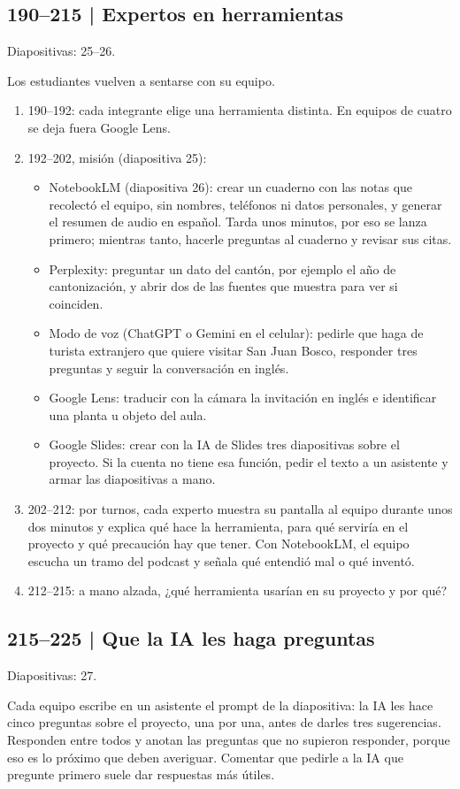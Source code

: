 \documentclass[11pt,a4paper]{article}
\newcommand{\diapos}[1]{\textcolor{gris}{\small\textsf{Diapositivas: #1}}\par}
\begin{document}
\subsection{190--215 | Expertos en herramientas}
\diapos{25--26.}
Los estudiantes vuelven a sentarse con su equipo.
\begin{enumerate}
\item 190--192: cada integrante elige una herramienta distinta. En equipos de cuatro se deja fuera Google Lens.
\item 192--202, misión (diapositiva 25):
  \begin{itemize}
  \item NotebookLM (diapositiva 26): crear un cuaderno con las notas que recolectó el equipo, sin nombres, teléfonos ni datos personales, y generar el resumen de audio en español. Tarda unos minutos, por eso se lanza primero; mientras tanto, hacerle preguntas al cuaderno y revisar sus citas.
  \item Perplexity: preguntar un dato del cantón, por ejemplo el año de cantonización, y abrir dos de las fuentes que muestra para ver si coinciden.
  \item Modo de voz (ChatGPT o Gemini en el celular): pedirle que haga de turista extranjero que quiere visitar San Juan Bosco, responder tres preguntas y seguir la conversación en inglés.
  \item Google Lens: traducir con la cámara la invitación en inglés e identificar una planta u objeto del aula.
  \item Google Slides: crear con la IA de Slides tres diapositivas sobre el proyecto. Si la cuenta no tiene esa función, pedir el texto a un asistente y armar las diapositivas a mano.
  \end{itemize}
\item 202--212: por turnos, cada experto muestra su pantalla al equipo durante unos dos minutos y explica qué hace la herramienta, para qué serviría en el proyecto y qué precaución hay que tener. Con NotebookLM, el equipo escucha un tramo del podcast y señala qué entendió mal o qué inventó.
\item 212--215: a mano alzada, ¿qué herramienta usarían en su proyecto y por qué?
\end{enumerate}

\subsection{215--225 | Que la IA les haga preguntas}
\diapos{27.}
Cada equipo escribe en un asistente el prompt de la diapositiva: la IA les hace cinco preguntas sobre el proyecto, una por una, antes de darles tres sugerencias. Responden entre todos y anotan las preguntas que no supieron responder, porque eso es lo próximo que deben averiguar. Comentar que pedirle a la IA que pregunte primero suele dar respuestas más útiles.
\end{document}
